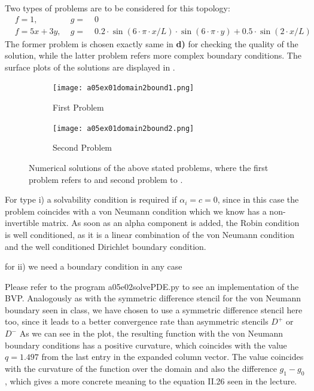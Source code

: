 %
Two types of problems are to be considered for this topology:
\begin{align}
	\label{eq:problem1}
	&f = 1, \;    	 & g = & \;0 \\
	\label{eq:problem2}
	&f = 5x + 3y, \; & g = & \; 0.2 \cdot \sin(6\cdot \pi \cdot x/L) \cdot \sin(6 \cdot \pi \cdot y) + 0.5 \cdot \sin(2\cdot x/L)
\end{align}
The former problem is chosen exactly same in \textbf{d)} for checking the quality of the solution, while the latter problem refers more complex boundary conditions.
The surface plots of the solutions are displayed in .
%
\begin{figure}[H]
\vspace*{\FigUpperVSpace}
\def\MeshFigWidth{210pt}
	\begin{subfigure}[b]{0.5\hsize}
		\centering
		\texttt{[image: a05ex01domain2bound1.png]} 
		\caption{First Problem}
		\label{fig:a05ex01domain2bound1}
	\end{subfigure}
	\begin{subfigure}[b]{0.5\hsize}
		\centering
		\texttt{[image: a05ex01domain2bound2.png]} 
		\caption{Second Problem}
		\label{fig:a05ex01domain2bound2}
	\end{subfigure}
	\caption{Numerical solutions of the above stated problems, where the first problem refers to  and second problem to .}
	\label{fig:a05ex01f}
\end{figure}

%
%

For type i) a solvability condition is required if $\alpha_i=c=0$, since in this case the problem coincides with a von Neumann condition which we know has a non- invertible matrix. As soon as an alpha component is added, the Robin condition is well conditioned, as it is a linear combination of the von Neumann condition and the well conditioned Dirichlet boundary condition.

for ii) we need a boundary condition in any case

Please refer to the program a05e02solvePDE.py to see an implementation of the BVP. Analogously as with the symmetric difference stencil for the von Neumann boundary seen in class, we have chosen to use a symmetric difference stencil here too, since it leads to a better convergence rate than asymmetric stencils $D^+$ or $D^-$
As we can see in the plot, the resulting function with the von Neumann boundary conditions has a positive curvature, which coincides with the value $q=1.497$ from the last entry in the expanded column vector. The value coincides with the curvature of the function over the domain and also the difference $g_1-g_0$, which gives a more concrete meaning to the equation II.26 seen in the lecture.

